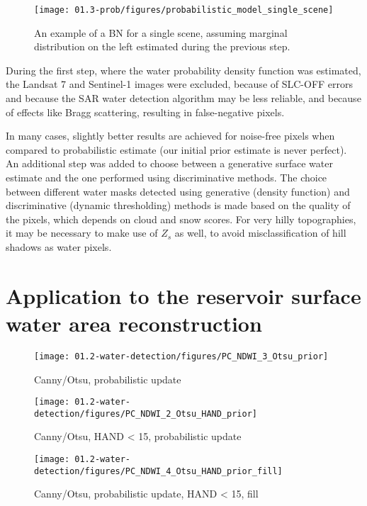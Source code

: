 \begin{figure}[H]
	\centering
	\texttt{[image: 01.3-prob/figures/probabilistic\_model\_single\_scene]}
	\caption{An example of a BN for a single scene, assuming marginal distribution on the left estimated during the previous step.}
	\label{fig:prob-diagram}
\end{figure}

During the first step, where the water probability density function was estimated, the Landsat 7 and Sentinel-1 images were excluded, because of SLC-OFF errors and because the SAR water detection algorithm may be less reliable, and because of effects like Bragg scattering, resulting in false-negative pixels.

In many cases, slightly better results are achieved for noise-free pixels when compared to probabilistic estimate (our initial prior estimate is never perfect). An additional step was added to choose between a generative surface water estimate and the one performed using discriminative methods. The choice between different water masks detected using generative (density function) and discriminative (dynamic thresholding) methods is made based on the quality of the pixels, which depends on cloud and snow scores. For very hilly topographies, it may be necessary to make use of $Z_s$ as well, to avoid misclassification of hill shadows as water pixels.

\section{Application to the reservoir surface water area reconstruction}

\begin{figure}
	\centering
	\texttt{[image: 01.2-water-detection/figures/PC\_NDWI\_3\_Otsu\_prior]}
	\caption{Canny/Otsu, probabilistic update}
	\label{fig:r1_canny_otsu_nb}
\end{figure}

\begin{figure}
	\centering
	\texttt{[image: 01.2-water-detection/figures/PC\_NDWI\_2\_Otsu\_HAND\_prior]}
	\caption{Canny/Otsu, HAND < 15, probabilistic update}
	\label{fig:r1_canny_otsu_hand_nb}
\end{figure}

\begin{figure}
	\centering
	\texttt{[image: 01.2-water-detection/figures/PC\_NDWI\_4\_Otsu\_HAND\_prior\_fill]}
	\caption{Canny/Otsu, probabilistic update, HAND < 15, fill}
	\label{fig:r1_canny_otsu_hand_nb_fill}
\end{figure}

